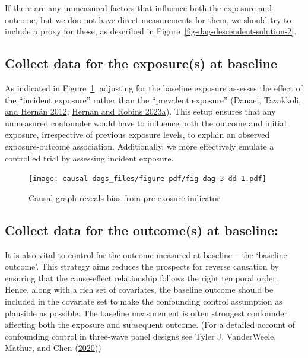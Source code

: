 \documentclass[
  singlecolumn]{report}
\begin{document}
If there are any unmeasured factors that influence both the exposure and
outcome, but we don not have direct measurements for them, we should try
to include a proxy for these, as described in
Figure~\ref{fig-dag-descendent-solution-2}.

\hypertarget{collect-data-for-the-exposures-at-baseline}{%
\subsection{\texorpdfstring{\textbf{Collect data for the exposure(s) at
baseline}}{Collect data for the exposure(s) at baseline}}\label{collect-data-for-the-exposures-at-baseline}}

As indicated in Figure~\ref{fig-dag-3-dd}, adjusting for the baseline
exposure assesses the effect of the ``incident exposure'' rather than
the ``prevalent exposure'' (\protect\hyperlink{ref-danaei2012}{Danaei,
Tavakkoli, and Hernán 2012}; \protect\hyperlink{ref-hernan2023}{Hernan
and Robins 2023a}). This setup ensures that any unmeasured confounder
would have to influence both the outcome and initial exposure,
irrespective of previous exposure levels, to explain an observed
exposure-outcome association. Additionally, we more effectively emulate
a controlled trial by assessing incident exposure.

\begin{figure}

{\centering \texttt{[image: causal-dags\_files/figure-pdf/fig-dag-3-dd-1.pdf]}

}

\caption{\label{fig-dag-3-dd}Causal graph reveals bias from pre-exosure
indicator}

\end{figure}

\hypertarget{collect-data-for-the-outcomes-at-baseline}{%
\subsection{\texorpdfstring{\textbf{Collect data for the outcome(s) at
baseline}:}{Collect data for the outcome(s) at baseline:}}\label{collect-data-for-the-outcomes-at-baseline}}

It is also vital to control for the outcome measured at baseline -- the
`baseline outcome'. This strategy aims reduces the prospects for reverse
causation by ensuring that the cause-effect relationship follows the
right temporal order. Hence, along with a rich set of covariates, the
baseline outcome should be included in the covariate set to make the
confounding control assumption as plausible as possible. The baseline
measurement is often strongest confounder affecting both the exposure
and subsequent outcome. (For a detailed account of confounding control
in three-wave panel designs see Tyler J. VanderWeele, Mathur, and Chen
(\protect\hyperlink{ref-vanderweele2020}{2020}))
\end{document}
